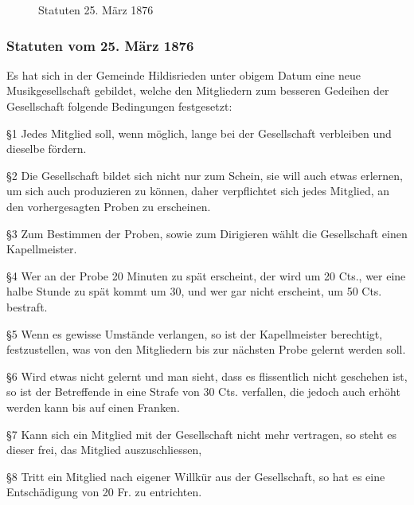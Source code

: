 
\begin{figure}[ht]
    \centering
    \hfil
    \caption{Statuten 25. März 1876}
    \label{fig:Statuten-1874}
\end{figure}

\begin{history}

    \subsubsection{Statuten vom 25. März 1876}

    Es hat sich in der Gemeinde Hildisrieden unter obigem Datum eine neue
    Musikgesellschaft gebildet, welche den Mitgliedern zum besseren Gedeihen der
    Gesellschaft folgende Bedingungen festgesetzt:

    \S1 Jedes Mitglied soll, wenn möglich, lange bei der Gesellschaft verbleiben
    und dieselbe fördern.

    \S2 Die Gesellschaft bildet sich nicht nur zum Schein, sie will auch etwas
    erlernen, um sich auch produzieren zu können, daher verpflichtet sich jedes
    Mitglied, an den vorhergesagten Proben zu erscheinen.

    \S3 Zum Bestimmen der Proben, sowie zum Dirigieren wählt die Gesellschaft
    einen Kapellmeister.

    \S4 Wer an der Probe 20 Minuten zu spät erscheint, der wird um 20 Cts., wer
    eine halbe Stunde zu spät kommt um 30, und wer gar nicht erscheint, um 50
    Cts. bestraft.

    \S5 Wenn es gewisse Umstände verlangen, so ist der Kapellmeister berechtigt,
    festzustellen, was von den Mitgliedern bis zur nächsten Probe gelernt werden
    soll.

    \S6 Wird etwas nicht gelernt und man sieht, dass es flissentlich nicht
    geschehen ist, so ist der Betreffende in eine Strafe von 30 Cts. verfallen,
    die jedoch auch erhöht werden kann bis auf einen Franken.

    \S7 Kann sich ein Mitglied mit der Gesellschaft nicht mehr vertragen, so
    steht es dieser frei, das Mitglied auszuschliessen,

    \S8 Tritt ein Mitglied nach eigener Willkür aus der Gesellschaft, so hat es
    eine Entschädigung von 20 Fr. zu entrichten.


\end{history}
